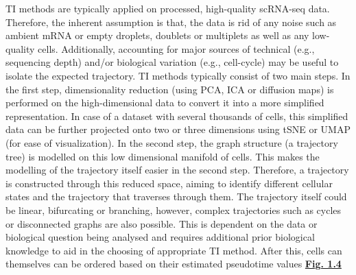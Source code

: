 TI methods are typically applied on processed, high-quality scRNA-seq data. Therefore, the inherent assumption is that, the data is rid of any noise such as ambient mRNA or empty droplets, doublets or multiplets as well as any low-quality cells. Additionally, accounting for major sources of technical (e.g., sequencing depth) and/or biological variation (e.g., cell-cycle) may be useful to isolate the expected trajectory. TI methods typically consist of two main steps. In the first step, dimensionality reduction (using PCA, ICA or diffusion maps) is performed on the high-dimensional data to convert it into a more simplified representation. In case of a dataset with several thousands of cells, this simplified data can be further projected onto two or three dimensions using tSNE or UMAP (for ease of visualization). In the second step, the graph structure (a trajectory tree) is modelled on this low dimensional manifold of cells. This makes the modelling of the trajectory itself easier in the second step. Therefore, a trajectory is constructed through this reduced space, aiming to identify different cellular states and the trajectory that traverses through them. The trajectory itself could be linear, bifurcating or branching, however, complex trajectories such as cycles or disconnected graphs are also possible. This is dependent on the data or biological question being analysed and requires additional prior biological knowledge to aid in the choosing of appropriate TI method. After this, cells can themselves can be ordered based on their estimated pseudotime values \hyperref[fig1-4]{\textbf{Fig. 1.4}} \\ %


